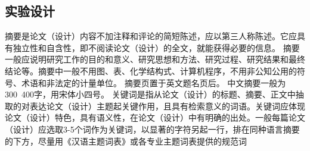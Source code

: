 \documentclass{document}
\begin{document}
\subsection{实验设计}
摘要是论文（设计）内容不加注释和评论的简短陈述，应以第三人称陈述。它应具有独立性和自含性，即不阅读论文（设计）的全文，就能获得必要的信息。
摘要一般应说明研究工作的目的和意义、研究思想和方法、研究过程、研究结果和最终结论等。摘要中一般不用图、表、化学结构式、计算机程序，不用非公知公用的符号、术语和非法定的计量单位。
摘要页置于英文题名页后。 
中文摘要一般为300~400字，用宋体小四号。 
关键词是指从论文（设计）的标题、摘要、正文中抽取的对表达论文（设计）主题起关键作用，且具有检索意义的词语。关键词应体现论文（设计）特色，具有语义性，在论文（设计）中有明确的出处。一般每篇论文（设计）应选取3-5个词作为关键词，以显著的字符另起一行，排在同种语言摘要的下方，尽量用《汉语主题词表》或各专业主题词表提供的规范词

\end{document}
